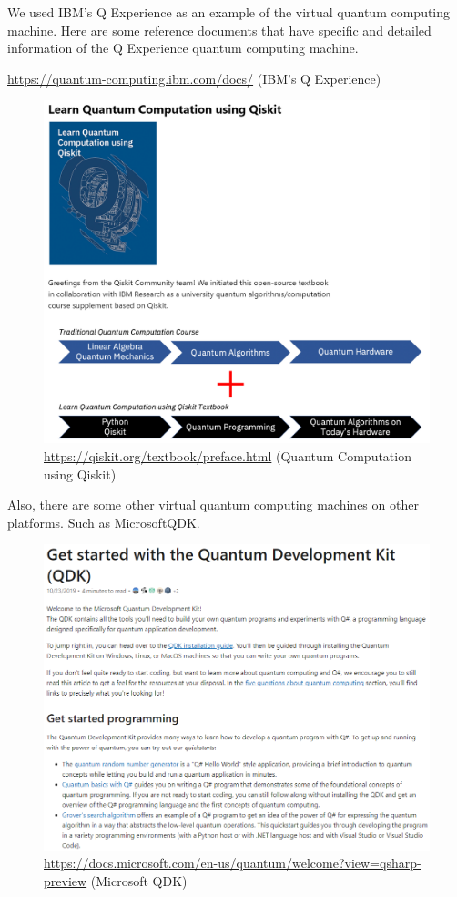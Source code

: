 \documentclass{article}
\begin{document}
We used IBM’s Q Experience as an example of the virtual quantum computing machine. Here are some reference documents that have specific and detailed information of the Q Experience quantum computing machine.

\url{https://quantum-computing.ibm.com/docs/} (IBM’s Q Experience)

\begin{figure}[htbp]
\centerline{\includegraphics[width=\textwidth]{8.png}}
\caption{\url{https://qiskit.org/textbook/preface.html} (Quantum Computation using Qiskit)}
\label{fig}
\end{figure}
\newpage

Also, there are some other virtual quantum computing machines on other platforms. Such as MicrosoftQDK.

\begin{figure}[htbp]
\centerline{\includegraphics[width=\textwidth]{9.png}}
\caption{\url{https://docs.microsoft.com/en-us/quantum/welcome?view=qsharp-preview} (Microsoft QDK)}
\label{fig}
\end{figure}
\end{document}
